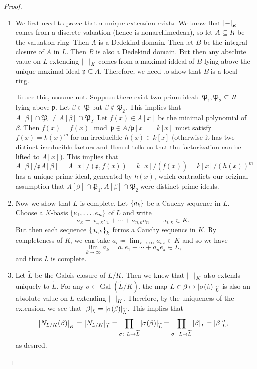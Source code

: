 \documentclass[leqno, openany]{memoir}
\theoremstyle{definition}
\theoremstyle{remark}
\theoremstyle{plain}
\theoremstyle{definition}
\theoremstyle{remark}
\newcommand{\mf}[1]{\mathfrak{#1}}
\newcommand{\ol}[1]{\overline{#1}}
\newcommand{\wt}[1]{\widetilde{#1}}
\DeclareMathOperator{\Gal}{Gal}
\begin{document}
\begin{proof}\leavevmode
    \begin{enumerate}
        \item We first need to prove that a unique extension exists. We know that $\abs{-}_K$ comes from a discrete valuation (hence is nonarchimedean), so let $A \subseteq K$ be the valuation ring. Then $A$ is a Dedekind domain. Then let $B$ be the integral closure of $A$ in $L$. Then $B$ is also a Dedekind domain. But then any absolute value on $L$ extending $\abs{-}_K$ comes from a maximal iddeal of $B$ lying above the unique maximal ideal $\mf{p} \subseteq A$. Therefore, we need to show that $B$ is a local ring.

            To see this, assume not. Suppose there exist two prime ideals $\mf{P}_1, \mf{P}_2 \subseteq B$ lying above $\mf{p}$. Let $\beta \in \mf{P}$ but $\beta \notin \mf{P}_2$. This implies that $A[\beta] \cap \mf{P}_1 \neq A[\beta] \cap \mf{P}_2$. Let $f(x) \in A[x]$ be the minimal polynomial of $\beta$. Then $\ol{f}(x) = f(x) \mod \mf{p} \in A/\mf{p}[x] = k[x]$ must satisfy $\ol{f}(x) = {h(x)}^m$ for an irreducible $h(x) \in k[x]$ (otherwise it has two distinct irreducible factors and Hensel tells us that the factorization can be lifted to $A[x]$). This implies that
            \[ A[\beta] / \mf{p} A[\beta] = A[x]/(\mf{p}, f(x)) = k[x] / (\ol{f}(x)) = k[x]/(h(x))^m \]
            has a unique prime ideal, generated by $h(x)$, which contradicts our original assumption that $A[\beta] \cap \mf{P}_1, A[\beta] \cap \mf{P}_2$ were distinct prime ideals.
        \item Now we show that $L$ is complete. Let $\qty{a_k}$ be a Cauchy sequence in $L$. Choose a $K$-basis $\qty{e_1, \ldots, e_n}$ of $L$ and write
            \[ a_k = a_{1,k} e_1 + \cdots + a_{n,k} e_n \qquad a_{i,k} \in K. \]
            But then each sequence $\qty{a_{i,k}}_k$ forms a Cauchy sequence in $K$. By completeness of $K$, we can take $a_i \coloneqq \lim_{k \to \infty} a_{i.k} \in K$ and so we have
            \[ \lim_{k \to \infty} a_k = a_1 e_1 + \cdots + a_n e_n \in L, \]
            and thus $L$ is complete.
        \item Let $\wt{L}$ be the Galois closure of $L/K$. Then we know that $\abs{-}_K$ also extends uniquely to $\wt{L}$. For any $\sigma \in \Gal(\wt{L}/K)$, the map $L \in \beta \mapsto \abs{\sigma(\beta)}_{\wt{L}}$ is also an absolute value on $L$ extending $\abs{-}_K$. Therefore, by the uniqueness of the extension, we see that $\abs{\beta}_L = \abs{\sigma(\beta)}_{\wt{L}}$. This implies that 
            \[ \abs{N_{L/K}(\beta)}_K = \abs{N_{L/K}}_{\wt{L}} = \prod_{\sigma \colon L \to \wt{L}} \abs{\sigma(\beta)}_{\wt{L}} = \prod_{\sigma \colon L \to \wt{L}} \abs{\beta}_L = \abs{\beta}_L^n, \]
            as desired. \qedhere
    \end{enumerate}
\end{proof}
\end{document}
